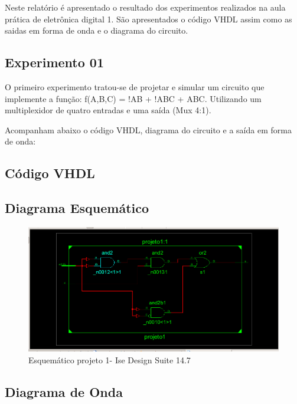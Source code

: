 \documentclass[12pts]{article}
\begin{document}
	Neste relatório é apresentado o resultado dos experimentos realizados na aula prática de eletrônica digital 1. São apresentados o código VHDL assim como as saidas em forma de onda e o diagrama do circuito. 

\subsection{Experimento 01}
\singlespacing
	O primeiro experimento tratou-se de projetar e simular um circuito que implemente a função: f(A,B,C) = !AB + !ABC + ABC. Utilizando um multiplexidor de quatro entradas e uma saída (Mux 4:1).

	Acompanham abaixo o código VHDL, diagrama do circuito e a saída em forma de onda:

\clearpage
\subsection{Código VHDL}


\clearpage
\subsection{Diagrama Esquemático}
\begin{figure}[!htb]
  \centering
  \includegraphics[scale=0.45]{imagens/circuito1}
  \caption{Esquemático projeto 1- Ise Design Suite 14.7}	
  \label{figRotulo}
\end{figure}

\newpage
\subsection{Diagrama de Onda}
\end{document}
